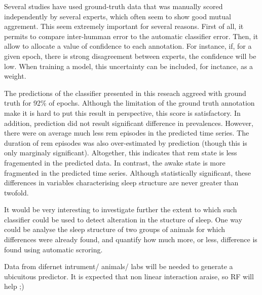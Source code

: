 Several studies have used ground-truth data that was manually scored independently by several experts, 
which often seem to show good mutual aggrement. 
This seem extremely important for several reasons.
First of all, it permits to compare inter-humman error to the automatic classifier error.
Then, it allow to allocate a value of confidence to each annotation. 
For instance, if, for a given epoch, there is strong disagreement between experts, the confidence will be low.
When training a model, this uncertainty can be included, for inctance, as a weight.

The predictions of the classifier presented in this reseach aggreed with ground truth for 92\% of epochs.
Although the limitation of the ground truth annotation make it is hard to put this result in perspective,
this score is satisfactory. In addition, prediction did not result significant difference in prevalences.
However, there were on average much less \gls{rem} episodes in the predicted time series. 
The duration of \gls{rem} episodes was also over-estimated by prediction (though this is only marginaly significant).
Altogether, this indicates that \gls{rem} state is less fragemented in the predicted data.
In contrast, the awake state is more fragmented in the predicted time series.
Although statistically significant, these differences in variables characterising sleep structure are never greater than twofold.

It would be very interesting to investigate further the extent to which such classifier could be used to detect alteration 
in the stucture of sleep.
One way could be analyse the sleep structure of two groups of animals for which differences were already found, and quantify how much more, or less,
difference is found using automatic scroring.

Data from difernet intrument/ animals/ labs will be needed to generate a ubicuitous predictor.
It is expected that non linear interaction araise, so RF will help ;)
